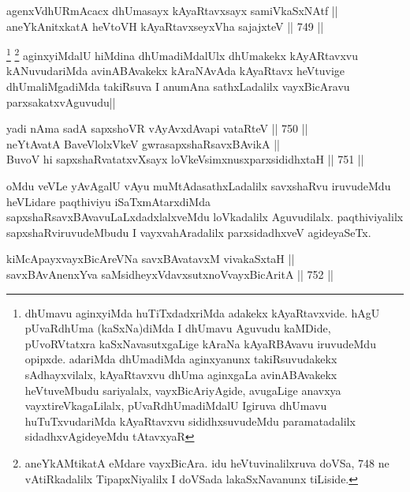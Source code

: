 
\begin{shl}
agenxVdhURmAcacx dhUmasayx kAyaRtavxsayx samiVkaSxNAtf || \\
aneYkAnitxkatA heVtoVH kAyaRtavxseyxVha sajajxteV ||  749 ||  
\end{shl}

\begin{artha}
\footnote{dhUmavu aginxyiMda huTiTxdadxriMda adakekx kAyaRtavxvide. hAgU pUvaRdhUma (kaSxNa)diMda I dhUmavu Aguvudu kaMDide, pUvoRVtatxra kaSxNavasutxgaLige kAraNa kAyaRBAvavu iruvudeMdu opipxde. adariMda dhUmadiMda aginxyanunx takiRsuvudakekx sAdhayxvilalx, kAyaRtavxvu dhUma aginxgaLa avinABAvakekx heVtuveMbudu sariyalalx, vayxBicAriyAgide, avugaLige anavxya vayxtireVkagaLilalx, pUvaRdhUmadiMdalU Igiruva dhUmavu huTuTxvudariMda kAyaRtavxvu sididhxsuvudeMdu paramatadalilx sidadhxvAgideyeMdu tAtavxyaR}
\footnote{aneYkAMtikatA eMdare vayxBicAra. idu heVtuvinalilxruva doVSa, 748 ne vAtiRkadalilx TipapxNiyalilx I doVSada lakaSxNavanunx tiLiside.}
aginxyiMdalU hiMdina dhUmadiMdalUlx dhUmakekx kAyARtavxvu kANuvudariMda avinABAvakekx kAraNAvAda kAyaRtavx heVtuvige dhUmaliMgadiMda takiRsuva I anumAna sathxLadalilx vayxBicAravu parxsakatxvAguvudu||
\end{artha}


\begin{shl}
yadi nAma sadA sapxshoVR vAyAvxdAvapi vataRteV ||  750 ||  \\
neYtAvatA BaveVlolxVkeV gwrasapxshaRsavxBAvikA || \\
BuvoV hi sapxshaRvatatxvXsayx loVkeV\s simxnusxparxsididhxtaH ||  751 ||  
\end{shl}

\begin{artha}
oMdu veVLe yAvAgalU vAyu muMtAdasathxLadalilx savxshaRvu iruvudeMdu heVLidare paqthiviyu iSaTxmAtarxdiMda sapxshaRsavxBAvavuLaLxdadxlalxveMdu loVkadalilx Aguvudilalx. paqthiviyalilx sapxshaRviruvudeMbudu I vayxvahAradalilx parxsidadhxveV agideyaSeTx. 
\end{artha}

\begin{shl}
kiMcApayxvayxBicAreVNa savxBAvatavxM vivakaSxtaH || \\
savxBAvAnenxYva saMsidheyxVdavxsutxnoV\s vayxBicAritA ||  752 ||  
\end{shl}

